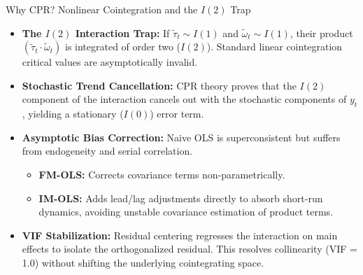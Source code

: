 \documentclass[10pt]{beamer}
\begin{document}
\begin{frame}{Why CPR? Nonlinear Cointegration and the $I(2)$ Trap}
  \begin{itemize}
    \item \textbf{The $I(2)$ Interaction Trap:} 
      If $\tilde{\tau}_t \sim I(1)$ and $\tilde{\omega}_t \sim I(1)$, their product $(\tilde{\tau}_t \cdot \tilde{\omega}_t)$ is integrated of order two ($I(2)$). Standard linear cointegration critical values are asymptotically invalid.
    \item \textbf{Stochastic Trend Cancellation:} 
      CPR theory proves that the $I(2)$ component of the interaction cancels out with the stochastic components of $y_t$, yielding a stationary ($I(0)$) error term.
    \item \textbf{Asymptotic Bias Correction:} 
      Naive OLS is superconsistent but suffers from endogeneity and serial correlation. 
      \begin{itemize}
        \item \textbf{FM-OLS:} Corrects covariance terms non-parametrically.
        \item \textbf{IM-OLS:} Adds lead/lag adjustments directly to absorb short-run dynamics, avoiding unstable covariance estimation of product terms.
      \end{itemize}
    \item \textbf{VIF Stabilization:} 
      Residual centering regresses the interaction on main effects to isolate the orthogonalized residual. This resolves collinearity (VIF = 1.0) without shifting the underlying cointegrating space.
  \end{itemize}
\end{frame}
\end{document}
